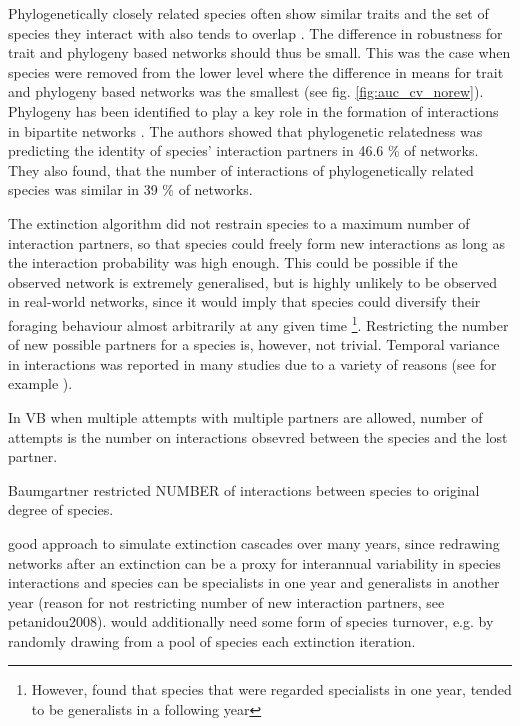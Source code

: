 \documentclass[12pt,a4paper]{article}
\begin{document}
Phylogenetically closely related species often show similar traits and the set of species they interact with also tends to overlap \parencite{Rezende2007, Gomez2010}. The difference in robustness for trait and phylogeny based networks should thus be small. This was the case when species were removed from the lower level where the difference in means for trait and phylogeny based networks was the smallest (see fig. \ref{fig:auc_cv_norew}). 
Phylogeny has been identified to play a key role in the formation of interactions in bipartite networks \parencite{Rezende2007}. The authors showed that phylogenetic relatedness was predicting the identity of species' interaction partners in 46.6 \% of networks. They also found, that the number of interactions of phylogenetically related species was similar in 39 \% of networks.

The extinction algorithm did not restrain species to a maximum number of interaction partners, so that species could freely form new interactions as long as the interaction probability was high enough. This could be possible if the observed network is extremely generalised, but is highly unlikely to be observed in real-world networks, since it would imply that species could diversify their foraging behaviour almost arbitrarily at any given time \footnote{However, \citeauthor{Petanidou2008} found that species that were regarded specialists in one year, tended to be generalists in a following year}. Restricting the number of new possible partners for a species is, however, not trivial. Temporal variance in interactions was reported in many studies due to a variety of reasons (see for example \cite{Olesen2008, CaraDonna2017, Schwarz2021}).

In VB when multiple attempts with multiple partners are allowed, number of attempts is the number on interactions obsevred between the species and the lost partner.

Baumgartner restricted NUMBER of interactions between species to original degree of species.


good approach to simulate extinction cascades over many years, since redrawing networks after an extinction can be a proxy for interannual variability in species interactions and species can be specialists in one year and generalists in another year (reason for not restricting number of new interaction partners, see petanidou2008). would additionally need some form of species turnover, e.g. by randomly drawing from a pool of species each extinction iteration.
\end{document}
